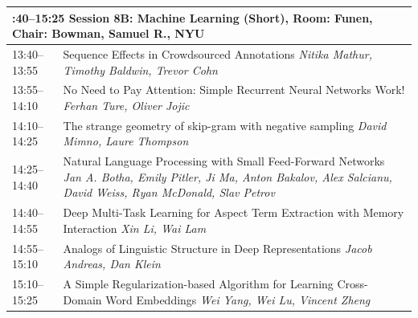 \documentclass{book}
\renewcommand{\large}{\fontsize{72}{80}\selectfont}
\renewcommand{\large}{\fontsize{82}{90}\selectfont}
\begin{document}
\begin{tabular}{p{20cm}p{70cm}}
  \multicolumn{2}{p{\textwidth}}{\bfseries\large 13:40--15:25 Session 8B: Machine Learning (Short), Room:  Funen, Chair:  Bowman, Samuel R., NYU} \\\hline

    
    13:40--13:55
    &	Sequence Effects in Crowdsourced Annotations \newline 
    {\itshape Nitika Mathur, Timothy Baldwin, Trevor Cohn} \\
    
    13:55--14:10
    &	No Need to Pay Attention: Simple Recurrent Neural Networks Work! \newline 
    {\itshape Ferhan Ture, Oliver Jojic} \\
    
    14:10--14:25
    &	The strange geometry of skip-gram with negative sampling \newline 
    {\itshape David Mimno, Laure Thompson} \\
    
    14:25--14:40
    &	Natural Language Processing with Small Feed-Forward Networks \newline 
    {\itshape Jan A. Botha, Emily Pitler, Ji Ma, Anton Bakalov, Alex Salcianu, David Weiss, Ryan McDonald, Slav Petrov} \\
    
    14:40--14:55
    &	Deep Multi-Task Learning for Aspect Term Extraction with Memory Interaction \newline 
    {\itshape Xin Li, Wai Lam} \\
    
    14:55--15:10
    &	Analogs of Linguistic Structure in Deep Representations \newline 
    {\itshape Jacob Andreas, Dan Klein} \\
    
    15:10--15:25
    &	A Simple Regularization-based Algorithm for Learning Cross-Domain Word Embeddings \newline 
    {\itshape Wei Yang, Wei Lu, Vincent Zheng} \\
    
\end{tabular}
\vspace*{\fill}
\end{document}

